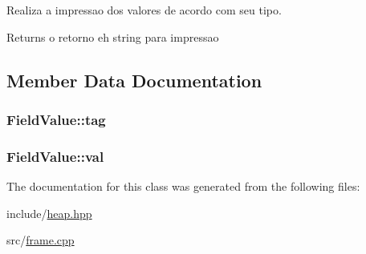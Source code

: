 Realiza a impressao dos valores de acordo com seu tipo. 

\begin{DoxyReturn}{Returns}
o retorno eh string para impressao 
\end{DoxyReturn}


\subsection{Member Data Documentation}
\hypertarget{classFieldValue_a9508255d1beec8c639696246fbd4a07e}{
\subsubsection[{tag}]{ Field\+Value\+::tag}}\label{classFieldValue_a9508255d1beec8c639696246fbd4a07e}
\hypertarget{classFieldValue_a5d86cc8c8756bd2ad41eeb7ff7586b62}{
\subsubsection[{val}]{ Field\+Value\+::val}}\label{classFieldValue_a5d86cc8c8756bd2ad41eeb7ff7586b62}


The documentation for this class was generated from the following files\+:\begin{DoxyCompactItemize}
\item 
include/\hyperlink{heap_8hpp}{heap.\+hpp}\item 
src/\hyperlink{frame_8cpp}{frame.\+cpp}\end{DoxyCompactItemize}
